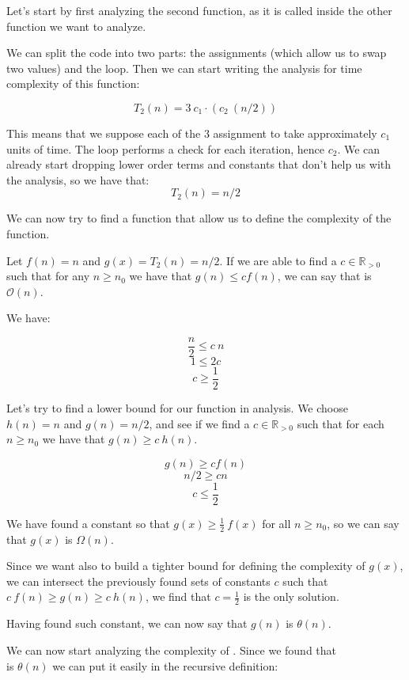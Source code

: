 \documentclass[12pt]{article}
\newcommand{\realpositivenumbers}{\mathbb{R}_{>0}} %
\newcommand{\bigO}{\mathcal{O}}
\begin{document}
Let's start by first analyzing the second function,  as it is called inside the other function we want to 
analyze. 

We can split the code into two parts: the assignments (which allow us to swap two values) and the loop.
Then we can start writing the analysis for time complexity of this function: 

$$ T_2(n) = 3\ c_1 \cdot (c_2\ (n/2))$$

This means that we suppose each of the 3 assignment to take approximately $c_1$ units of time. The loop performs a check for
each iteration, hence $c_2$.
We can already start dropping lower order terms and constants that don't help us with the analysis, so we have that:
$$ T_2(n) = n/2 $$

We can now try to find a function that allow us to define the complexity of the  function.
\vspace{1cm}

Let $f(n) = n $ and $g(x) = T_2(n) = n/2$. If we are able to find a $c \in \realpositivenumbers$ such that for 
any $n \geq n_0$ we have that $g(n) \leq cf(n)$, we can say that  is $\bigO(n)$.

We have:

$$ \frac{n}{2} \leq c\ n $$
$$ 1 \leq 2c $$
$$ c \geq \frac{1}{2} $$

Let's try to find a lower bound for our function in analysis. We choose $h(n) = n$ and $g(n) = n / 2$, and see if we find a $c \in \realpositivenumbers $ such that for each $n \geq n_0$ we have that $g(n) \geq c\ h(n)$.

$$ g(n) \geq c f(n) $$
$$ n/2 \geq c n $$
$$ c \leq \frac{1}{2} $$

We have found a constant so that $g(x) \geq \frac{1}{2}\ f(x)$ for all $n \geq n_0$, so we can say that $g(x)$ is $\Omega(n)$.
\vspace{1cm}

Since we want also to build a tighter bound for defining the complexity of $g(x)$, we can intersect the previously found sets of constants $c$ such that $c\ f(n) \geq g(n) \geq c\ h(n)$, we find that $c = \frac{1}{2}$ is the only solution.

Having found such constant, we can now say that $g(n)$ is $\theta (n)$.
\pagebreak

We can now start analyzing the complexity of . Since we found that \\  is $\theta(n)$ we 
can put it easily in the  recursive definition:
\end{document}
